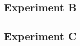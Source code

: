 \documentclass[twoside]{ctuthesis}
\theoremstyle{plain}
\theoremstyle{definition}
\theoremstyle{note}
\begin{document}
\subsection{Experiment B}






\subsection{Experiment C}
\end{document}
